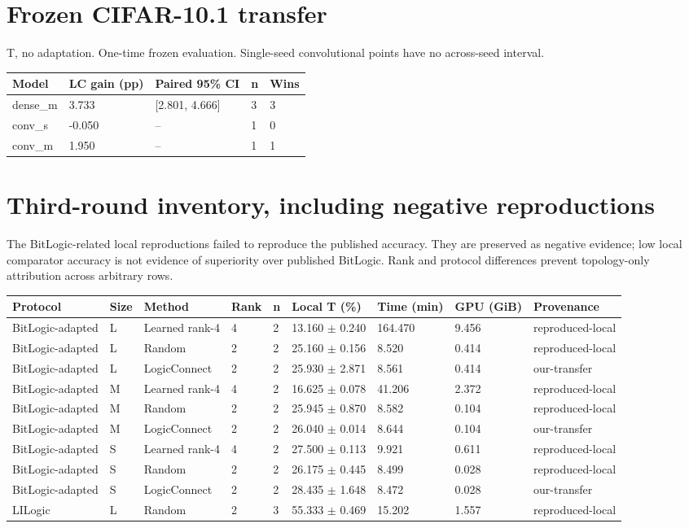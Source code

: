 \documentclass[10pt,a4paper]{article}
\begin{document}
\section*{Frozen CIFAR-10.1 transfer}
T, no adaptation. One-time frozen evaluation. Single-seed convolutional points have no across-seed interval.
\par\bigskip
\setlength{\tabcolsep}{2pt}
\begin{tabular}{@{}p{57mm}p{47.0mm}p{47.0mm}p{47.0mm}p{47.0mm}@{}}
\toprule
Model & LC gain (pp) & Paired 95\% CI & n & Wins \\ \midrule
dense\_m & 3.733 & [2.801, 4.666] & 3 & 3 \\
conv\_s & -0.050 & -- & 1 & 0 \\
conv\_m & 1.950 & -- & 1 & 1 \\
\bottomrule
\end{tabular}
\clearpage
\section*{Third-round inventory, including negative reproductions}
The BitLogic-related local reproductions failed to reproduce the published accuracy. They are preserved as negative evidence; low local comparator accuracy is not evidence of superiority over published BitLogic. Rank and protocol differences prevent topology-only attribution across arbitrary rows.
\par\bigskip
\setlength{\tabcolsep}{2pt}
\begin{tabular}{@{}p{29mm}p{25.5mm}p{25.5mm}p{25.5mm}p{25.5mm}p{25.5mm}p{25.5mm}p{25.5mm}p{25.5mm}@{}}
\toprule
Protocol & Size & Method & Rank & n & Local T (\%) & Time (min) & GPU (GiB) & Provenance \\ \midrule
BitLogic-adapted & L & Learned rank-4 & 4 & 2 & 13.160 $\pm$ 0.240 & 164.470 & 9.456 & reproduced-local \\
BitLogic-adapted & L & Random & 2 & 2 & 25.160 $\pm$ 0.156 & 8.520 & 0.414 & reproduced-local \\
BitLogic-adapted & L & LogicConnect & 2 & 2 & 25.930 $\pm$ 2.871 & 8.561 & 0.414 & our-transfer \\
BitLogic-adapted & M & Learned rank-4 & 4 & 2 & 16.625 $\pm$ 0.078 & 41.206 & 2.372 & reproduced-local \\
BitLogic-adapted & M & Random & 2 & 2 & 25.945 $\pm$ 0.870 & 8.582 & 0.104 & reproduced-local \\
BitLogic-adapted & M & LogicConnect & 2 & 2 & 26.040 $\pm$ 0.014 & 8.644 & 0.104 & our-transfer \\
BitLogic-adapted & S & Learned rank-4 & 4 & 2 & 27.500 $\pm$ 0.113 & 9.921 & 0.611 & reproduced-local \\
BitLogic-adapted & S & Random & 2 & 2 & 26.175 $\pm$ 0.445 & 8.499 & 0.028 & reproduced-local \\
BitLogic-adapted & S & LogicConnect & 2 & 2 & 28.435 $\pm$ 1.648 & 8.472 & 0.028 & our-transfer \\
LILogic & L & Random & 2 & 3 & 55.333 $\pm$ 0.469 & 15.202 & 1.557 & reproduced-local \\
\bottomrule
\end{tabular}
\clearpage
\end{document}
